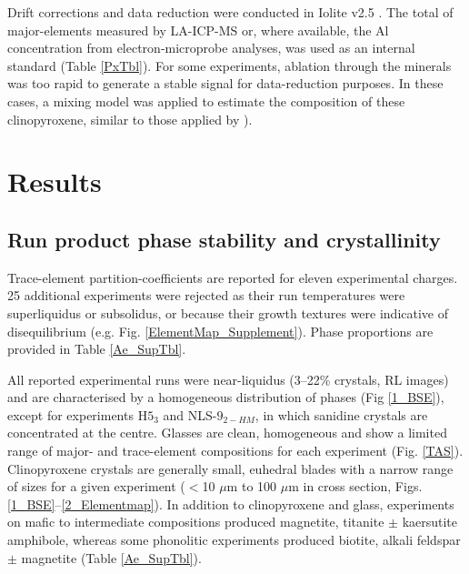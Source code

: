 \documentclass[review,authoryear,12pt]{elsarticle}
\begin{document}
Drift corrections and data reduction were conducted in Iolite v2.5 \citep{Paton2011}. The total of major-elements measured by LA-ICP-MS or, where available, the Al concentration from electron-microprobe analyses, was used as an internal standard (Table \ref{PxTbl}). For some experiments, ablation through the minerals was too rapid to generate a stable signal for data-reduction purposes. In these cases, a mixing model was applied to estimate the composition of these clinopyroxene, similar to those applied by \citet[][see supplementary methods \ref{LaserMix}]{Rubatto2007,Yang2018}).

\section{Results}
\subsection{Run product phase stability and crystallinity}
Trace-element partition-coefficients are reported for eleven experimental charges. 25 additional experiments were rejected as their run temperatures were superliquidus or subsolidus, or because their growth textures were indicative of disequilibrium (e.g. Fig. \ref{ElementMap_Supplement}). Phase proportions are provided in Table \ref{Ae_SupTbl}.

All reported experimental runs were near-liquidus (3--22\% crystals, RL images)
and are characterised by a homogeneous distribution of phases (Fig \ref{1_BSE}), except for experiments H$5_3$ and NLS-$9_{2-HM}$, in which sanidine crystals are concentrated at the centre. Glasses are clean, homogeneous and show a limited range of major- and trace-element compositions for each experiment (Fig. \ref{TAS}). Clinopyroxene crystals are generally small, euhedral blades with a narrow range of sizes for a given experiment ($<$10 $\mu$m to 100 $\mu$m in cross section, Figs. \ref{1_BSE}--\ref{2_Elementmap}). In addition to clinopyroxene and glass, experiments on mafic to intermediate compositions produced magnetite, titanite $\pm$ kaersutite amphibole, whereas some phonolitic experiments produced biotite, alkali feldspar $\pm$ magnetite (Table \ref{Ae_SupTbl}). 
\end{document}
